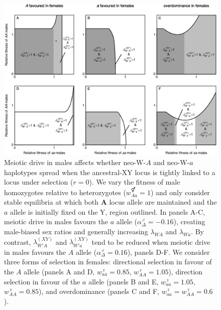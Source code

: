 \documentclass[12pt]{article}
\begin{document}
\begin{figure}[!h]
\centering
\centerline{\includegraphics[width=\linewidth]{Region_Plot_combined_MaleDrive.eps}}
\caption{
Meiotic drive in males affects whether neo-W-$A$ and neo-W-$a$ haplotypes spread when the ancestral-XY locus is tightly linked to a locus under selection ($r=0$). 
We vary the fitness of male homozygotes relative to heterozygotes ($w_{Aa}^\Hermaphrodite=1$) and only consider stable equilibria at which both \textbf{A} locus allele are maintained and the $a$ allele is initially fixed on the Y, region outlined. 
In panels A-C, meiotic drive in males favours the $a$ allele ($\alpha_{\Delta}^\male=-0.16$), creating male-biased sex ratios and generally increasing $\lambda_{WA}$ and $\lambda_{Wa}$. 
By contrast, $\lambda_{W'A}^{(XY)}$ and $\lambda_{W'a}^{(XY)}$ tend to be reduced when meiotic drive in males favours the $A$ allele ($\alpha_{\Delta}^\male=0.16$), panels D-F. 
We consider three forms of selection in females: directional selection in favour of the $A$ allele (panels A and D, $w_{aa}^\female=0.85$, $w_{AA}^\female=1.05$), direction selection in favour of the $a$ allele (panels B and E, $w_{aa}^\female=1.05$, $w_{AA}^\female=0.85$), and overdominance (panels C and F, $w_{aa}^\female=w_{AA}^\female=0.6$).
}
\label{fig:regionMaleDrive}
\end{figure}
\end{document}
